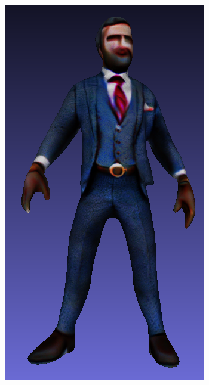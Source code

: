 \begin{figure}[ht]
\begin{subfigure}[b]{0.16\textwidth}
        \centering
        \includegraphics[width=\textwidth]{etc/bias/bias_rich_genie_3.png}
        \caption{}
    \end{subfigure}
    \begin{subfigure}[b]{0.097\textwidth}
        \centering

\end{subfigure}
\end{figure}
